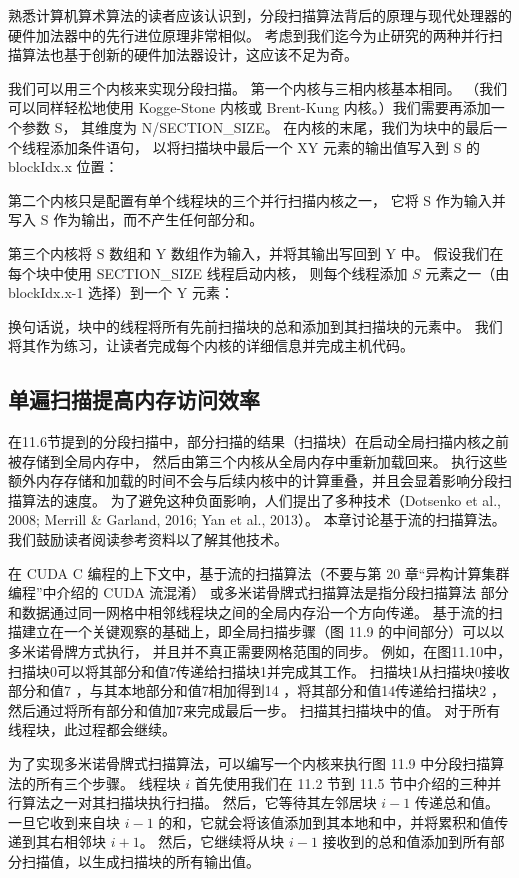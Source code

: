 熟悉计算机算术算法的读者应该认识到，分段扫描算法背后的原理与现代处理器的硬件加法器中的先行进位原理非常相似。 
考虑到我们迄今为止研究的两种并行扫描算法也基于创新的硬件加法器设计，这应该不足为奇。

我们可以用三个内核来实现分段扫描。 第一个内核与三相内核基本相同。 
（我们可以同样轻松地使用 Kogge-Stone 内核或 Brent-Kung 内核。）我们需要再添加一个参数 S，
其维度为 N/SECTION\_SIZE。 
在内核的末尾，我们为块中的最后一个线程添加条件语句，
以将扫描块中最后一个 $\mathrm{XY}$ 元素的输出值写入到 S 的 blockIdx.x 位置：

第二个内核只是配置有单个线程块的三个并行扫描内核之一，
它将 $\mathrm{S}$ 作为输入并写入 $\mathrm{S}$ 作为输出，而不产生任何部分和。

第三个内核将 $\mathrm{S}$ 数组和 $\mathrm{Y}$ 数组作为输入，并将其输出写回到 Y 中。
假设我们在每个块中使用 SECTION\_SIZE 线程启动内核，
则每个线程添加 $S$ 元素之一（由 blockIdx.x-1 选择）到一个 $\mathrm{Y}$ 元素：

换句话说，块中的线程将所有先前扫描块的总和添加到其扫描块的元素中。 
我们将其作为练习，让读者完成每个内核的详细信息并完成主机代码。

\subsection{单遍扫描提高内存访问效率}
在11.6节提到的分段扫描中，部分扫描的结果（扫描块）在启动全局扫描内核之前被存储到全局内存中，
然后由第三个内核从全局内存中重新加载回来。 
执行这些额外内存存储和加载的时间不会与后续内核中的计算重叠，并且会显着影响分段扫描算法的速度。 
为了避免这种负面影响，人们提出了多种技术（Dotsenko et al., 2008; Merrill \& Garland, 2016; Yan et al., 2013）。 
本章讨论基于流的扫描算法。 我们鼓励读者阅读参考资料以了解其他技术。

在 CUDA C 编程的上下文中，基于流的扫描算法（不要与第 20 章“异构计算集群编程”中介绍的 CUDA 流混淆）
或多米诺骨牌式扫描算法是指分段扫描算法 部分和数据通过同一网格中相邻线程块之间的全局内存沿一个方向传递。 
基于流的扫描建立在一个关键观察的基础上，即全局扫描步骤（图 11.9 的中间部分）可以以多米诺骨牌方式执行，
并且并不真正需要网格范围的同步。 例如，在图11.10中，扫描块0可以将其部分和值7传递给扫描块1并完成其工作。 
扫描块1从扫描块0接收部分和值7 ，与其本地部分和值7相加得到14 ，将其部分和值14传递给扫描块2 ，
然后通过将所有部分和值加7来完成最后一步。 扫描其扫描块中的值。 对于所有线程块，此过程都会继续。

为了实现多米诺骨牌式扫描算法，可以编写一个内核来执行图 11.9 中分段扫描算法的所有三个步骤。 
线程块 $i$ 首先使用我们在 11.2 节到 11.5 节中介绍的三种并行算法之一对其扫描块执行扫描。 
然后，它等待其左邻居块 $i-1$ 传递总和值。 
一旦它收到来自块 $i-1$ 的和，它就会将该值添加到其本地和中，并将累积和值传递到其右相邻块 $i+1$。 
然后，它继续将从块 $i-1$ 接收到的总和值添加到所有部分扫描值，以生成扫描块的所有输出值。

